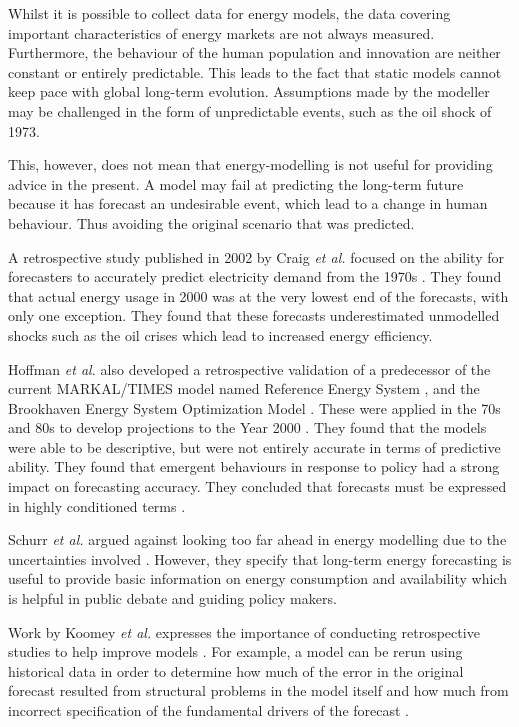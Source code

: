 \documentclass[final,3p,times,twocolumn,numbers]{elsarticle}
\begin{document}
Whilst it is possible to collect data for energy models, the data covering important characteristics of energy markets are not always measured. Furthermore, the behaviour of the human population and innovation are neither constant or entirely predictable. This leads to the fact that static models cannot keep pace with global long-term evolution. Assumptions made by the modeller may be challenged in the form of unpredictable events, such as the oil shock of 1973.

This, however, does not mean that energy-modelling is not useful for providing advice in the present. A model may fail at predicting the long-term future because it has forecast an undesirable event, which lead to a change in human behaviour. Thus avoiding the original scenario that was predicted.

A retrospective study published in 2002 by Craig \textit{et al.} focused on the ability for forecasters to accurately predict electricity demand from the 1970s \cite{Craig2002}. They found that actual energy usage in 2000 was at the very lowest end of the forecasts, with only one exception. They found that these forecasts underestimated unmodelled shocks such as the oil crises which lead to increased energy efficiency.

Hoffman \textit{et al.} also developed a retrospective validation of a predecessor of the current MARKAL\slash TIMES model named Reference Energy System \cite{Hoffman_1973}, and the Brookhaven Energy System Optimization Model \cite{ERDA_48}. These were applied in the 70s and 80s to develop projections to the Year 2000 . They found that the models were able to be descriptive, but were not entirely accurate in terms of predictive ability. They found that emergent behaviours in response to policy had a strong impact on forecasting accuracy. They concluded that forecasts must be expressed in highly conditioned terms \cite{Hoffman2011}. 

Schurr \textit{et al.} argued against looking too far ahead in energy modelling due to the uncertainties involved \cite{Schurr_1961}. However, they specify that long-term energy forecasting is useful to provide basic information on energy consumption and availability which is helpful in public debate and guiding policy makers.


Work by Koomey \textit{et al.} expresses the importance of conducting retrospective studies to help improve models \cite{Koomey2003}. For example, a model can be rerun using historical data in order to determine how much of the error in the original forecast resulted from structural problems in the model itself and how much from incorrect specification of the fundamental drivers of the forecast \cite{Koomey2003}.
\end{document}
